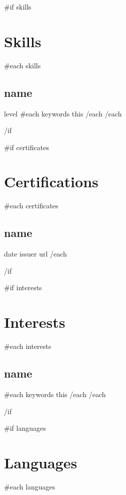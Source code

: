 \documentclass[letterpaper]{article}
\begin{document}
\color{primary-950}
\fontsize{11pt}{14pt}\selectfont

\begin{paracol}{2}
\begin{leftcolumn*}

  {{#if skills}}
  \section*{Skills}{
  {{#each skills}}
    \subsection*{ {{name}} }{
      {{ level }}\newline
      {{#each keywords}}{{ this }}{{/each}}\newline
    }
    {{/each}}
  }
  {{/if}}

  {{#if certificates}}
  \section*{Certifications}{
    {{#each certificates}}
    \subsection*{ {{ name }} } {
      {{ date }}\newline
      {{ issuer }}\newline
      {{ url }}\newline
    }
    {{/each}}
  }
  {{/if}}

  {{#if interests}}
  \section*{Interests} {
    {{#each interests}}
    \subsection*{ {{ name }} } {
      {{#each keywords}}
        {{ this }} 
      {{/each}}\newline
    }
    {{/each}}
  }
  {{/if}}

  {{#if languages}}
  \section*{Languages} {
    {{#each languages}}
}
\end{leftcolumn*}
\end{paracol}
\end{document}
